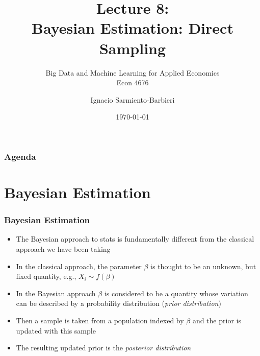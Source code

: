 \documentclass[
  shownotes,
  xcolor={svgnames},
  hyperref={colorlinks,citecolor=DarkBlue,linkcolor=DarkRed,urlcolor=DarkBlue}
  , aspectratio=169]{beamer}
\begin{document}
\title[Lecture 8]{Lecture 8: \\  Bayesian Estimation: Direct Sampling}
\subtitle{Big Data and Machine Learning for Applied Economics \\ Econ 4676}
\date{\today}

\author[Sarmiento-Barbieri]{Ignacio Sarmiento-Barbieri}


\begin{frame}[noframenumbering]
\maketitle
\end{frame}





\begin{frame}
\frametitle{Agenda}

\tableofcontents


\end{frame}
\section{Bayesian Estimation}
\begin{frame}[fragile]
\frametitle{Bayesian Estimation}

\begin{itemize}
\item The Bayesian approach to stats is fundamentally different from the classical approach we have been taking
\medskip
\item In the classical approach, the parameter $\beta$ is thought to be an unknown, but fixed quantity, e.g., $X_i\sim f(\beta)$
\medskip
\item In the Bayesian approach $\beta$ is considered to be a quantity whose variation can be described by a probability distribution  ({\it prior distribution})
\medskip
\item Then a sample is taken from a population indexed by $\beta$ and the prior is updated with this sample
\medskip
\item The resulting updated prior is the {\it posterior distribution}
\end{itemize}
\end{frame}
\end{document}
